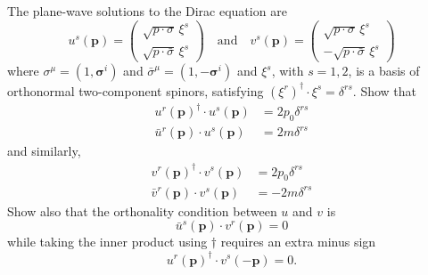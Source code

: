The plane-wave solutions to the Dirac equation are
\begin{equation}
    u^s(\mathbf{p}) = \begin{pmatrix}\sqrt{p\cdot\sigma}\,\xi^s \\ \sqrt{p\cdot\bar\sigma}\,\xi^s\end{pmatrix} \quad \text{and} \quad v^s(\mathbf{p}) = \begin{pmatrix}\sqrt{p\cdot\sigma}\,\xi^s \\ -\sqrt{p\cdot\bar\sigma}\,\xi^s\end{pmatrix}
\end{equation}
where $\sigma^\mu = (1, \mathbf{\sigma}^i)$ and $\bar\sigma^\mu = (1, -\mathbf{\sigma}^i)$ and $\xi^s$, with $s=1,2$, is a basis of orthonormal two-component spinors, satisfying $(\xi^r)^\dagger\cdot\xi^s = \delta^{rs}$. Show that
\begin{align}
    u^r(\mathbf{p})^\dagger\cdot u^s(\mathbf{p}) &= 2p_0\delta^{rs}\\
    \bar{u}^r(\mathbf{p})\cdot u^s(\mathbf{p}) &= 2m\delta^{rs}
\end{align}
and similarly,
\begin{align}
    v^r(\mathbf{p})^\dagger\cdot v^s(\mathbf{p}) &= 2p_0\delta^{rs}\\
    \bar{v}^r(\mathbf{p})\cdot v^s(\mathbf{p}) &= -2m\delta^{rs}
\end{align}
Show also that the orthonality condition between $u$ and $v$ is
\begin{equation}
    \bar{u}^s(\mathbf{p})\cdot v^r(\mathbf{p}) = 0
\end{equation}
while taking the inner product using $\dagger$ requires an extra minus sign
\begin{equation}
    u^r(\mathbf{p})^\dagger\cdot v^s(-\mathbf{p}) = 0.
\end{equation}


